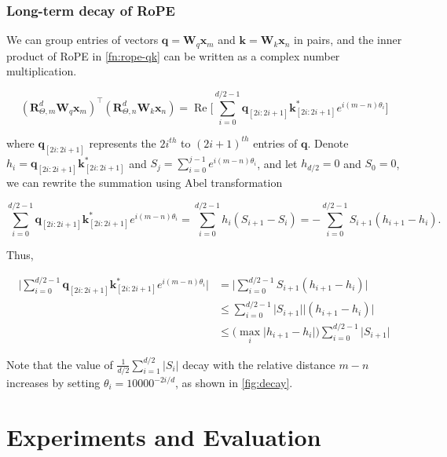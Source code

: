 \subsubsection{Long-term decay of RoPE}\label{appendix:long-term-decay}
We can group entries of vectors ${\boldsymbol q}={\boldsymbol W}_q{\boldsymbol x}_m$ and ${\boldsymbol k}={\boldsymbol W}_k{\boldsymbol x}_n$ in pairs, and the inner product of RoPE in \ref{fn:rope-qk} can be written as a complex number multiplication.

\begin{equation}
	({\boldsymbol R}^d_{\Theta, m}{\boldsymbol W}_q{\boldsymbol x}_m)^\intercal({\boldsymbol R}^d_{\Theta, n}{\boldsymbol W}_k{\boldsymbol x}_n) = \operatorname{Re}\bigg[\sum_{i=0}^{d/2-1}{\boldsymbol q}_{[2i:2i+1]}{\boldsymbol k}_{[2i:2i+1]}^{*}e^{i(m-n)\theta_{i}}\bigg]
\end{equation}

where ${\boldsymbol q}_{[2i:2i+1]}$ represents the $2i^{th}$ to $(2i+1)^{th}$ entries of ${\boldsymbol q}$. Denote $h_i={\boldsymbol q}_{[2i:2i+1]}{\boldsymbol k}_{[2i:2i+1]}^{*}$ and $S_j=\sum_{i=0}^{j-1}e^{i(m-n)\theta_i}$, and let $h_{d/2}=0$ and $S_0=0$, we can rewrite the summation using Abel transformation

\begin{equation}
	\sum_{i=0}^{d/2-1}{\boldsymbol q}_{[2i:2i+1]}{\boldsymbol k}_{[2i:2i+1]}^{*}e^{i(m-n)\theta_{i}}=\sum_{i=0}^{d/2-1}h_i(S_{i+1}-S_{i})=-\sum_{i=0}^{d/2-1}S_{i+1}(h_{i+1}-h_i).
\end{equation}

Thus,

\begin{equation}
	\begin{aligned}
		\bigg\vert\sum_{i=0}^{d/2-1}{\boldsymbol q}_{[2i:2i+1]}{\boldsymbol k}_{[2i:2i+1]}^{*}e^{i(m-n)\theta_{i}}\bigg\vert &= \bigg\vert\sum_{i=0}^{d/2-1}S_{i+1}(h_{i+1}-h_i)\bigg\vert\\
		&\leq \sum_{i=0}^{d/2-1}\vert S_{i+1}\vert\vert(h_{i+1}-{h_i})\vert\\
		&\leq \big(\max_i\vert h_{i+1}-h_i\vert\big)\sum_{i=0}^{d/2-1}\vert S_{i+1}\vert
	\end{aligned}
\end{equation}

Note that the value of $\frac{1}{d/2}\sum_{i=1}^{d/2}\vert S_i\vert$ decay with the relative distance $m-n$ increases by setting $\theta_i=10000^{-2i/d}$, as shown in \ref{fig:decay}.

\section{Experiments and Evaluation}
\label{sec:experiment}

